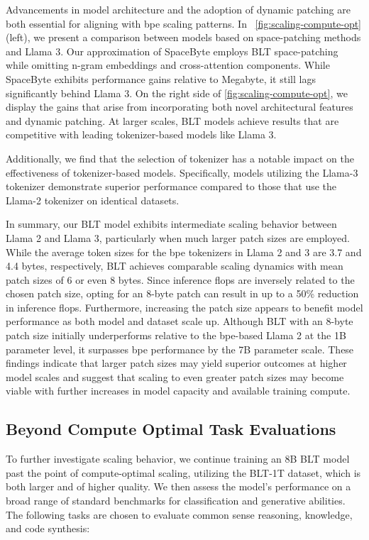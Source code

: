 Advancements in model architecture and the adoption of dynamic patching are both essential for aligning with bpe scaling patterns. In ~\autoref{fig:scaling-compute-opt} (left), we present a comparison between models based on space-patching methods and Llama 3. Our approximation of SpaceByte \citep{slagle2024spacebyte} employs {\textsc BLT} space-patching while omitting n-gram embeddings and cross-attention components. While SpaceByte exhibits performance gains relative to Megabyte, it still lags significantly behind Llama 3. On the right side of \autoref{fig:scaling-compute-opt}, we display the gains that arise from incorporating both novel architectural features and dynamic patching. At larger scales, {\textsc BLT} models achieve results that are competitive with leading tokenizer-based models like Llama 3.

Additionally, we find that the selection of tokenizer has a notable impact on the effectiveness of tokenizer-based models. Specifically, models utilizing the Llama-3 tokenizer demonstrate superior performance compared to those that use the Llama-2 tokenizer on identical datasets.

In summary, our {\textsc BLT} model exhibits intermediate scaling behavior between Llama 2 and Llama 3, particularly when much larger patch sizes are employed. While the average token sizes for the bpe tokenizers in Llama 2 and 3 are 3.7 and 4.4 bytes, respectively, {\textsc BLT} achieves comparable scaling dynamics with mean patch sizes of 6 or even 8 bytes. Since inference flops are inversely related to the chosen patch size, opting for an 8-byte patch can result in up to a 50\% reduction in inference flops. Furthermore, increasing the patch size appears to benefit model performance as both model and dataset scale up. Although {\textsc BLT} with an 8-byte patch size initially underperforms relative to the bpe-based Llama 2 at the 1B parameter level, it surpasses bpe performance by the 7B parameter scale. These findings indicate that larger patch sizes may yield superior outcomes at higher model scales and suggest that scaling to even greater patch sizes may become viable with further increases in model capacity and available training compute.

\subsection{Beyond Compute Optimal Task Evaluations}
\label{section:evals}
To further investigate scaling behavior, we continue training an 8B {\textsc BLT} model past the point of compute-optimal scaling, utilizing the {\textsc BLT}-1T dataset, which is both larger and of higher quality. We then assess the model's performance on a broad range of standard benchmarks for classification and generative abilities. The following tasks are chosen to evaluate common sense reasoning, knowledge, and code synthesis:
